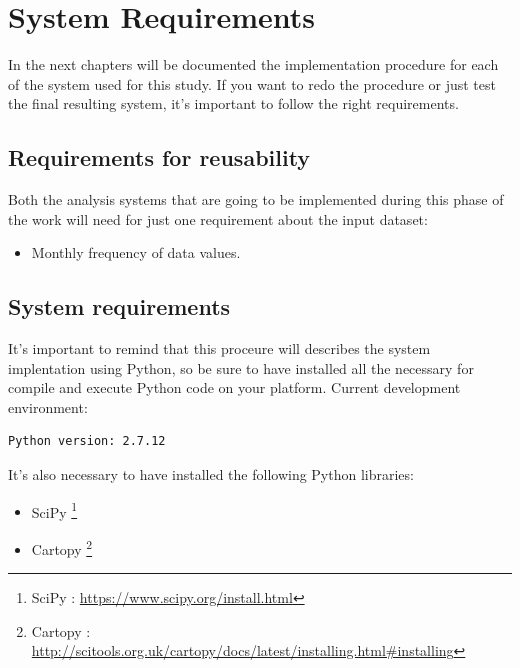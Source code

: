 




\section{System Requirements}
In the next chapters will be documented the implementation procedure for each of the system used for this study. If you want to redo the procedure or just test the final resulting system, it's important to follow the right requirements.

\subsection{Requirements for reusability}
\vspace{-5mm}
Both the analysis systems that are going to be implemented during this phase of the work will need for just one requirement about the input dataset:
\vspace{-5mm}
\begin{itemize}
\item Monthly frequency of data values.
\end{itemize}

\subsection{System requirements}
\vspace{-5mm}
It's important to remind that this proceure will describes the system implentation using Python, so be sure to have installed all the necessary for compile and execute Python code on your platform. Current development environment:
\begin{lstlisting}
Python version: 2.7.12
\end{lstlisting}
\vspace{-5mm}
It's also necessary to have installed the following Python libraries:
\vspace{-5mm}
\begin{itemize}
\setlength{\itemsep}{-5pt}
\item  SciPy \footnote{SciPy : \url{https://www.scipy.org/install.html}}
\item Cartopy \footnote{Cartopy : \url{http://scitools.org.uk/cartopy/docs/latest/installing.html\#installing}}
\end{itemize}



